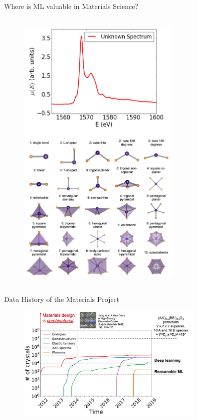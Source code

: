 \documentclass[aspectratio=169]{beamer}
\begin{document}
\begin{frame}[t]{Where is ML valuable in Materials Science?}
\begin{columns}[t]
\begin{figure}
        \centering
        \includegraphics[width=0.7\textwidth]{lectures/slides_tex/figures/xas_interpretation.png}
    \end{figure}
\end{columns}
\end{frame}


\begin{frame}{Data History of the Materials Project}
    \begin{figure}
        \centering
        \includegraphics[width=0.8\textwidth]{lectures/slides_tex/figures/mp_data_hist.png}
    \end{figure}
\end{frame}
\end{document}
